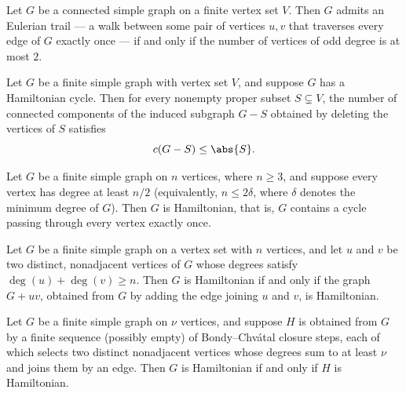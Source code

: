 \begin{theorem}
\label{SimpleGraph.euler_trail_iff_le_two_odd}
Let $G$ be a connected simple graph on a finite vertex set $V$. Then $G$ admits an
Eulerian trail — a walk between some pair of vertices $u,v$ that traverses every edge of
$G$ exactly once — if and only if the number of vertices of odd degree is at most $2$.
\end{theorem}

\begin{theorem}
\label{SimpleGraph.hamiltonian_toughness}
Let $G$ be a finite simple graph with vertex set $V$, and suppose $G$ has a Hamiltonian
cycle. Then for every nonempty proper subset $S \subsetneq V$, the number of connected
components of the induced subgraph $G - S$ obtained by deleting the vertices of $S$
satisfies
\[ c(G - S) \le \abs{S}. \]
\end{theorem}

\begin{theorem}
\label{SimpleGraph.dirac_hamiltonian}
Let $G$ be a finite simple graph on $n$ vertices, where $n \ge 3$, and suppose every
vertex has degree at least $n/2$ (equivalently, $n \le 2\delta$, where $\delta$ denotes
the minimum degree of $G$). Then $G$ is Hamiltonian, that is, $G$ contains a cycle
passing through every vertex exactly once.
\end{theorem}

\begin{theorem}
\label{SimpleGraph.bondy_chvatal}
Let $G$ be a finite simple graph on a vertex set with $n$ vertices, and let $u$ and $v$
be two distinct, nonadjacent vertices of $G$ whose degrees satisfy $\deg(u) + \deg(v)
\ge n$. Then $G$ is Hamiltonian if and only if the graph $G + uv$, obtained from $G$ by
adding the edge joining $u$ and $v$, is Hamiltonian.
\end{theorem}

\begin{theorem}
\label{SimpleGraph.hamiltonian_iff_of_closureSteps}
Let $G$ be a finite simple graph on $\nu$ vertices, and suppose $H$ is obtained from $G$
by a finite sequence (possibly empty) of Bondy–Chvátal closure steps, each of which
selects two distinct nonadjacent vertices whose degrees sum to at least $\nu$ and joins
them by an edge. Then $G$ is Hamiltonian if and only if $H$ is Hamiltonian.
\end{theorem}

